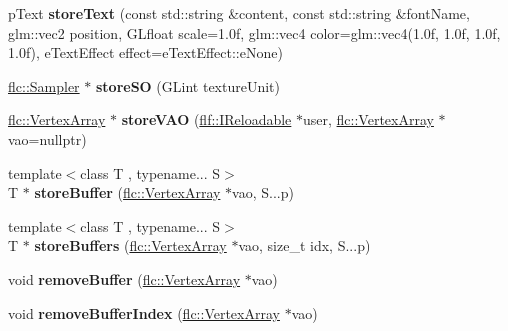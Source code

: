 \begin{DoxyCompactItemize}
\item 
p\+Text {\bfseries store\+Text} (const std\+::string \&content, const std\+::string \&font\+Name, glm\+::vec2 position, G\+Lfloat scale=1.\+0f, glm\+::vec4 color=glm\+::vec4(1.\+0f, 1.\+0f, 1.\+0f, 1.\+0f), e\+Text\+Effect effect=e\+Text\+Effect\+::e\+None)\hypertarget{classflw_1_1Engine_a9dda9b1fc63f416e05404389f7a3bb5f}{}\label{classflw_1_1Engine_a9dda9b1fc63f416e05404389f7a3bb5f}

\item 
\hyperlink{classflw_1_1flc_1_1Sampler}{flc\+::\+Sampler} $\ast$ {\bfseries store\+SO} (G\+Lint texture\+Unit)\hypertarget{classflw_1_1Engine_a8ca2976f879365fdeaab18646da9c327}{}\label{classflw_1_1Engine_a8ca2976f879365fdeaab18646da9c327}

\item 
\hyperlink{classflw_1_1flc_1_1VertexArray}{flc\+::\+Vertex\+Array} $\ast$ {\bfseries store\+V\+AO} (\hyperlink{classflw_1_1flf_1_1IReloadable}{flf\+::\+I\+Reloadable} $\ast$user, \hyperlink{classflw_1_1flc_1_1VertexArray}{flc\+::\+Vertex\+Array} $\ast$vao=nullptr)\hypertarget{classflw_1_1Engine_ae6de8a2803a2802739377dacadde496a}{}\label{classflw_1_1Engine_ae6de8a2803a2802739377dacadde496a}

\item 
{\footnotesize template$<$class T , typename... S$>$ }\\T $\ast$ {\bfseries store\+Buffer} (\hyperlink{classflw_1_1flc_1_1VertexArray}{flc\+::\+Vertex\+Array} $\ast$vao, S...\+p)\hypertarget{classflw_1_1Engine_a9dbbd4dd393fc420a68007781d3f7508}{}\label{classflw_1_1Engine_a9dbbd4dd393fc420a68007781d3f7508}

\item 
{\footnotesize template$<$class T , typename... S$>$ }\\T $\ast$ {\bfseries store\+Buffers} (\hyperlink{classflw_1_1flc_1_1VertexArray}{flc\+::\+Vertex\+Array} $\ast$vao, size\+\_\+t idx, S...\+p)\hypertarget{classflw_1_1Engine_ae9b593271f7b78401e12f325c780de33}{}\label{classflw_1_1Engine_ae9b593271f7b78401e12f325c780de33}

\item 
void {\bfseries remove\+Buffer} (\hyperlink{classflw_1_1flc_1_1VertexArray}{flc\+::\+Vertex\+Array} $\ast$vao)\hypertarget{classflw_1_1Engine_a8835f81ea40d7bf078381f5fd27dd004}{}\label{classflw_1_1Engine_a8835f81ea40d7bf078381f5fd27dd004}

\item 
void {\bfseries remove\+Buffer\+Index} (\hyperlink{classflw_1_1flc_1_1VertexArray}{flc\+::\+Vertex\+Array} $\ast$vao)\hypertarget{classflw_1_1Engine_aa388b763d05e260c6818f7ede1961101}{}\label{classflw_1_1Engine_aa388b763d05e260c6818f7ede1961101}


\end{DoxyCompactItemize}
